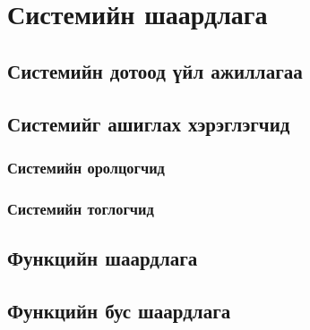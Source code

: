 \chapter{Системийн шаардлага}
\label{chapter3}
\section{Системийн дотоод үйл ажиллагаа}

\section{Системийг ашиглах хэрэглэгчид}
\subsection{Системийн оролцогчид}

\subsection{Системийн тоглогчид}

\section{Функцийн шаардлага}
\section{Функцийн бус шаардлага}
